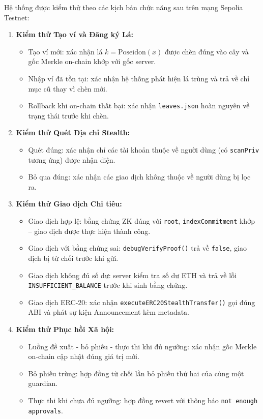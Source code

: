 \documentclass[../DoAn.tex]{subfiles}
\begin{document}
Hệ thống được kiểm thử theo các kịch bản chức năng sau trên mạng Sepolia Testnet:

\begin{enumerate}
    \item \textbf{Kiểm thử Tạo ví và Đăng ký Lá:}
    \begin{itemize}
        \item Tạo ví mới: xác nhận lá $k = \text{Poseidon}(x)$ được chèn đúng vào cây và gốc Merkle on-chain khớp với gốc server.
        \item Nhập ví đã tồn tại: xác nhận hệ thống phát hiện lá trùng và trả về chỉ mục cũ thay vì chèn mới.
        \item Rollback khi on-chain thất bại: xác nhận \texttt{leaves.json} hoàn nguyên về trạng thái trước khi chèn.
    \end{itemize}

    \item \textbf{Kiểm thử Quét Địa chỉ Stealth:}
    \begin{itemize}
        \item Quét đúng: xác nhận chỉ các tài khoản thuộc về người dùng (có \texttt{scanPriv} tương ứng) được nhận diện.
        \item Bỏ qua đúng: xác nhận các giao dịch không thuộc về người dùng bị lọc ra.
    \end{itemize}

    \item \textbf{Kiểm thử Giao dịch Chi tiêu:}
    \begin{itemize}
        \item Giao dịch hợp lệ: bằng chứng ZK đúng với \texttt{root}, \texttt{indexCommitment} khớp -- giao dịch được thực hiện thành công.
        \item Giao dịch với bằng chứng sai: \texttt{debugVerifyProof()} trả về \texttt{false}, giao dịch bị từ chối trước khi gửi.
        \item Giao dịch không đủ số dư: server kiểm tra số dư ETH và trả về lỗi \texttt{INSUFFICIENT\_BALANCE} trước khi sinh bằng chứng.
        \item Giao dịch ERC-20: xác nhận \texttt{executeERC20StealthTransfer()} gọi đúng ABI và phát sự kiện Announcement kèm metadata.
    \end{itemize}

    \item \textbf{Kiểm thử Phục hồi Xã hội:}
    \begin{itemize}
        \item Luồng đề xuất - bỏ phiếu - thực thi khi đủ ngưỡng: xác nhận gốc Merkle on-chain cập nhật đúng giá trị mới.
        \item Bỏ phiếu trùng: hợp đồng từ chối lần bỏ phiếu thứ hai của cùng một guardian.
        \item Thực thi khi chưa đủ ngưỡng: hợp đồng revert với thông báo \texttt{not enough approvals}.
    \end{itemize}


\end{enumerate}
\end{document}
